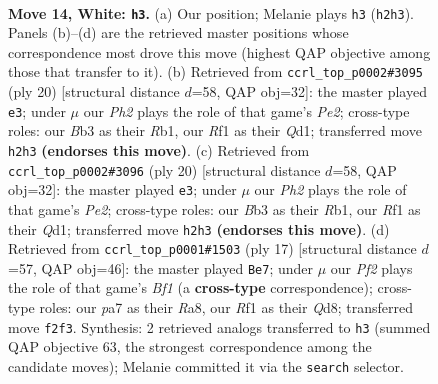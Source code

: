 \documentclass[11pt]{article}
\begin{document}
\clearpage

\begin{figure}[p]\centering
\begin{subfigure}{0.46\textwidth}\centering
\resizebox{\linewidth}{!}{%
\newchessgame
\chessboard[
  setfen={rnbqr1k1/pp3pbp/1n4p1/3p4/3P4/1B6/PP3PPP/RNBQNRK1 w - - 0 14},
  showmover=false,
  pgfstyle=straightmove, color=movearrow, markmove={h2-h3}
]}
\caption{}
\end{subfigure}\hfill
\begin{subfigure}{0.46\textwidth}\centering
\resizebox{\linewidth}{!}{%
\newchessgame
\chessboard[
  setfen={r1bqk2r/ppp2ppp/1n6/3p4/3P1B2/b1P5/P2NPPPP/1R1QKB1R w Kkq - 3 11},
  showmover=false,
  pgfstyle=straightmove, color=movearrow, markmove={e2-e3}
]}
\caption{}
\end{subfigure}
\\[4pt]
\begin{subfigure}{0.46\textwidth}\centering
\resizebox{\linewidth}{!}{%
\newchessgame
\chessboard[
  setfen={r1bqk2r/ppp2ppp/1n6/3p4/3P1B2/b1P5/P2NPPPP/1R1QKB1R w Kkq - 3 11},
  showmover=false,
  pgfstyle=straightmove, color=movearrow, markmove={e2-e3}
]}
\caption{}
\end{subfigure}\hfill
\begin{subfigure}{0.46\textwidth}\centering
\resizebox{\linewidth}{!}{%
\newchessgame
\chessboard[
  setfen={r1bqkb1r/ppp2ppp/3p1n2/8/4P3/2NQ1N1P/PP3PP1/R1B2RK1 b kq - 0 9},
  showmover=false,
  pgfstyle=straightmove, color=movearrow, markmove={f8-e7}
]}
\caption{}
\end{subfigure}
\caption{\textbf{Move 14, White: \texttt{h3}.} (a) Our position; Melanie plays \texttt{h3} (\texttt{h2h3}). Panels (b)--(d) are the retrieved master positions whose correspondence most drove this move (highest QAP objective among those that transfer to it). (b) Retrieved from \texttt{ccrl\_top\_p0002\#3095} (ply 20) [structural distance $d$=58, QAP obj=32]: the master played \texttt{e3}; under $\mu$ our \emph{Ph2} plays the role of that game's \emph{Pe2}; cross-type roles: our \emph{B}b3 as their \emph{R}b1, our \emph{R}f1 as their \emph{Q}d1; transferred move \texttt{h2h3} \textbf{(endorses this move)}. (c) Retrieved from \texttt{ccrl\_top\_p0002\#3096} (ply 20) [structural distance $d$=58, QAP obj=32]: the master played \texttt{e3}; under $\mu$ our \emph{Ph2} plays the role of that game's \emph{Pe2}; cross-type roles: our \emph{B}b3 as their \emph{R}b1, our \emph{R}f1 as their \emph{Q}d1; transferred move \texttt{h2h3} \textbf{(endorses this move)}. (d) Retrieved from \texttt{ccrl\_top\_p0001\#1503} (ply 17) [structural distance $d$=57, QAP obj=46]: the master played \texttt{Be7}; under $\mu$ our \emph{Pf2} plays the role of that game's \emph{Bf1} (a \textbf{cross-type} correspondence); cross-type roles: our \emph{p}a7 as their \emph{R}a8, our \emph{R}f1 as their \emph{Q}d8; transferred move \texttt{f2f3}. Synthesis: 2 retrieved analogs transferred to \texttt{h3} (summed QAP objective 63, the strongest correspondence among the candidate moves); Melanie committed it via the \texttt{search} selector.}
\label{fig:thought-m26}
\end{figure}
\end{document}
